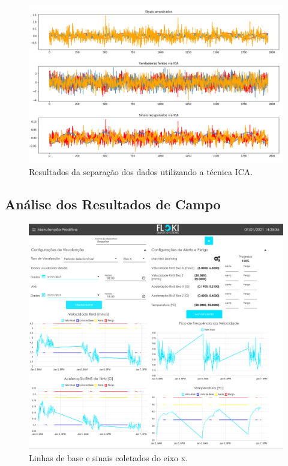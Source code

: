 \begin{figure}[H]
    \caption{Resultados da separação dos dados utilizando a técnica ICA.}
    \begin{center}
        \includegraphics[scale=.4]{resultados/img/ica.png}
    \end{center}
    \label{fig:ica}
\end{figure}


% 

\subsection{Análise dos Resultados de Campo}


\begin{figure}[H]
    \caption{Linhas de base e sinais coletados do eixo x.}
    \begin{center}
        \includegraphics[scale=.15]{resultados/img/drakkar_eixo_x.png}
    \end{center}
    \label{fig:ica}
\end{figure}

